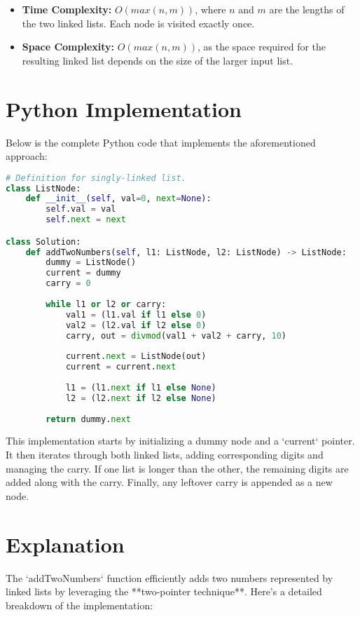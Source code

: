 \begin{itemize}
    \item \textbf{Time Complexity:} \(O(max(n, m))\), where \(n\) and \(m\) are the lengths of the two linked lists. Each node is visited exactly once.
    \item \textbf{Space Complexity:} \(O(max(n, m))\), as the space required for the resulting linked list depends on the size of the larger input list.
\end{itemize}

\section*{Python Implementation}

Below is the complete Python code that implements the aforementioned approach:

\begin{fullwidth}
\begin{lstlisting}[language=Python]
# Definition for singly-linked list.
class ListNode:
    def __init__(self, val=0, next=None):
        self.val = val
        self.next = next

class Solution:
    def addTwoNumbers(self, l1: ListNode, l2: ListNode) -> ListNode:
        dummy = ListNode()
        current = dummy
        carry = 0
        
        while l1 or l2 or carry:
            val1 = (l1.val if l1 else 0)
            val2 = (l2.val if l2 else 0)
            carry, out = divmod(val1 + val2 + carry, 10)
            
            current.next = ListNode(out)
            current = current.next
            
            l1 = (l1.next if l1 else None)
            l2 = (l2.next if l2 else None)
        
        return dummy.next
\end{lstlisting}
\end{fullwidth}

This implementation starts by initializing a dummy node and a `current` pointer. It then iterates through both linked lists, adding corresponding digits and managing the carry. If one list is longer than the other, the remaining digits are added along with the carry. Finally, any leftover carry is appended as a new node.

\section*{Explanation}
The `addTwoNumbers` function efficiently adds two numbers represented by linked lists by leveraging the **two-pointer technique**. Here's a detailed breakdown of the implementation:

